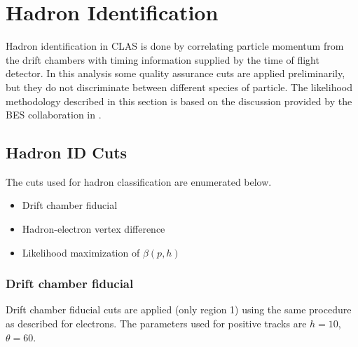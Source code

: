 \section{Hadron Identification}
Hadron identification in CLAS is done by correlating particle momentum from the drift chambers with timing information supplied by the time of flight detector.  In this analysis some quality assurance cuts are applied preliminarily, but they do not discriminate between different species of particle.  The likelihood methodology described in this section is based on the discussion provided by the BES collaboration in \cite{misc-ping:2009}.  

\subsection{Hadron ID Cuts}
The cuts used for hadron classification are enumerated below.

\begin{itemize}
  \item{Drift chamber fiducial}
  \item{Hadron-electron vertex difference}
  \item{Likelihood maximization of $\beta(p,h)$}
\end{itemize}


\subsubsection*{Drift chamber fiducial}
Drift chamber fiducial cuts are applied (only region 1) using the same procedure as described for electrons.  The parameters used for positive tracks are $h = 10$, $\theta = 60$.

